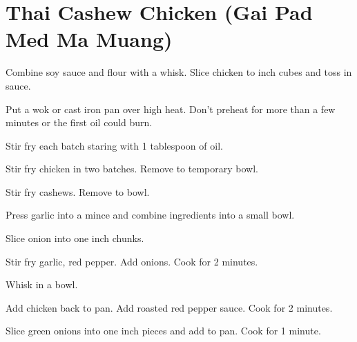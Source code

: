 \section{Thai Cashew Chicken (Gai Pad Med Ma Muang)}
\begin{recipe}



Combine soy sauce and flour with a whisk. Slice chicken to  inch cubes and 
toss in sauce. 

Put a wok or cast iron pan over high heat. Don't preheat for more than a few minutes 
or the first oil could burn. 


Stir fry each batch staring with 1 tablespoon of oil. 

Stir fry chicken in two batches. Remove to temporary bowl. 


Stir fry cashews. Remove to bowl. 


Press garlic into a mince and combine ingredients into a small bowl. 


Slice onion into one inch chunks. 

Stir fry garlic, red pepper. Add onions. Cook for 2 minutes. 


Whisk in a bowl. 

Add chicken back to pan. Add roasted red pepper sauce. Cook for 2 minutes. 


Slice green onions into one inch pieces and add to pan. Cook for 1 minute.

\end{recipe}
